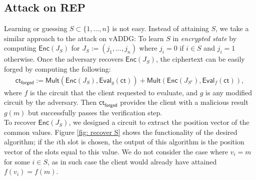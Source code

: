 \documentclass[runningheads]{llncs}
\newcommand{\ct}{\textsf{ct}{}}
\newcommand{\eval}{\textsf{Eval}}
\newcommand{\REP}{\textsf{REP}{}}
\newcommand{\enc}{\textsf{Enc}}
\begin{document}
    \subsection{Attack on \REP} \label{subsec: Attack on the REP}
    Learning or guessing $S\subset\{1,\dots,n\}$ is not easy. Instead of attaining $S$, we take a similar approach to the attack on vADDG: To learn $S$ in \emph{encrypted state} by computing $\enc(J_S)$ for $J_S:=(j_1,\dots,j_n)$ where $j_i=0$ if $i\in S$ and $j_i=1$ otherwise. 
    Once the adversary recovers $\enc(J_S)$, the ciphertext can be easily forged by computing the following:
        \begin{align*}
            \ct_{\textsf{forged}}:=\mathsf{Mult}(\enc(J_S),\eval_g(\ct)) + \mathsf{Mult}(\enc(J_{S^c}),\eval_f(\ct)),
        \end{align*}
    where $f$ is the circuit that the client requested to evaluate, and $g$ is any modified circuit by the adversary. 
    Then $\ct_{\textsf{forged}}$ provides the client with a malicious result $g(m)$ but successfully passes the verification step.\\
    
    To recover $\enc(J_{S})$, we designed a circuit to extract the position vector of the common values. 
    Figure \ref{fig: recover S} shows the functionality of the desired algorithm; if the $i$th slot is chosen, the output of this algorithm is the position vector of the slots equal to this value.
    We do not consider the case where $v_i = m$ for some $i \in S$, as in such case the client would already have attained $f(v_i) = f(m)$.
\end{document}
